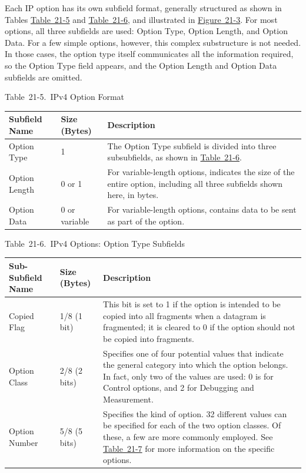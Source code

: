 Each IP option has its own subfield format, generally structured as
shown in Tables
\protect\hyperlink{ch21s03.htmlux5cux23ipv_option_format}{Table~21-5}
and
\protect\hyperlink{ch21s03.htmlux5cux23ipv_options_option_type_subfields}{Table~21-6},
and illustrated in
\protect\hyperlink{ch21s03.htmlux5cux23ipv4_options_field_format_this_diagram_s}{Figure~21-3}.
For most options, all three subfields are used: Option
Type,
Option Length, and Option Data. For a few simple options, however, this
complex substructure is not needed. In those cases, the option type
itself communicates all the information required, so the Option Type
field appears, and the Option Length and Option Data subfields are
omitted.



Table~21-5.~IPv4 Option Format

\begin{longtable}[]{@{}lll@{}}
\toprule
Subfield Name & Size (Bytes) & Description\tabularnewline
\midrule
\endhead
Option Type & 1 & The Option Type subfield is divided into three
subsubfields, as shown in
\protect\hyperlink{ch21s03.htmlux5cux23ipv_options_option_type_subfields}{Table~21-6}.\tabularnewline
Option Length & 0 or 1 & For variable-length
options,
indicates the size of the entire option, including all three subfields
shown here, in bytes.\tabularnewline
Option Data & 0 or variable & For variable-length
options,
contains data to be sent as part of the option.\tabularnewline
\bottomrule
\end{longtable}



Table~21-6.~IPv4 Options: Option Type Subfields

\begin{longtable}[]{@{}lll@{}}
\toprule
Sub-Subfield Name & Size (Bytes) & Description\tabularnewline
\midrule
\endhead
Copied Flag & 1/8 (1 bit) & This bit is set to 1 if the option is
intended to be copied into all fragments when a datagram is fragmented;
it is cleared to 0 if the option should not be copied into
fragments.\tabularnewline
Option Class & 2/8 (2 bits) & Specifies one of four potential values
that indicate the general category into which the option belongs. In
fact, only two of the values are used: 0 is for Control options, and 2
for Debugging and Measurement.\tabularnewline
Option Number & 5/8 (5 bits) & Specifies the kind of option. 32
different values can be specified for each of the two option classes. Of
these, a few are more commonly employed. See
\protect\hyperlink{ch21s03.htmlux5cux23common_ipv_options}{Table~21-7}
for more information on the specific options.\tabularnewline
\bottomrule
\end{longtable}


